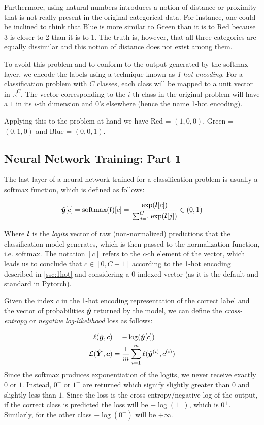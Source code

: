 Furthermore, using natural numbers introduces a notion of distance or proximity that is not really present in the original categorical data. For instance, one could be inclined to think that Blue is more similar to Green than it is to Red because 3 is closer to 2 than it is to 1. The truth is, however, that all three categories are equally dissimilar and this notion of distance does not exist among them.

To avoid this problem and to conform to the output generated by the softmax layer, we encode the labels using a technique known as \emph{1-hot encoding}. For a classification problem with $C$ classes, each class will be mapped to a unit vector in $\mathbb{R}^C$. The vector corresponding to the $i$-th class in the original problem will have a $1$ in its $i$-th dimension and $0$'s elsewhere (hence the name 1-hot encoding).

Applying this to the problem at hand we have Red = $(1,0,0)$, Green = $(0,1,0)$ and Blue = $(0,0,1)$.

\subsection{Neural Network Training: Part 1}
The last layer of a neural network trained for a classification problem is usually a softmax function, which is defined as follows:

\begin{equation*}
    \hat{\bm{y}}[c] = \text{softmax}(\bm{l})[c] = \frac{\exp(\bm{l}[c])}{\sum_{j=1}^C \exp(\bm{l}[j])} \in (0,1)
\end{equation*}

Where $\bm{l}$ is the \emph{logits} vector of raw (non-normalized) predictions that the classification model generates, which is then passed to the normalization function, i.e. softmax. The notation $[c]$ refers to the $c$-th element of the vector, which leads us to conclude that $c \in [0,C-1]$ according to the 1-hot encoding described in \ref{ssc:1hot} and considering a 0-indexed vector (as it is the default and standard in Pytorch).

Given the index $c$ in the 1-hot encoding representation of the correct label and the vector of probabilities $\hat{\bm{y}}$ returned by the model, we can define the \emph{cross-entropy} or \emph{negative log-likelihood} loss as follows:

\begin{align*}
    \ell(\hat{\bm{y}},c) &= -\log(\hat{\bm{y}}[c]) \\
    \mathcal{L}(\hat{\bm{Y}},\bm{c}) &= \frac{1}{m}\sum_{i=1}^m \ell(\hat{\bm{y}}^{(i)},c^{(i)})
\end{align*}
Since the softmax produces exponentiation of the logits, we never receive exactly $0$ or $1$. Instead, $0^+$ or $1^-$ are returned which signify slightly greater than $0$ and slightly less than $1$.
Since the loss is the cross entropy/negative log of the output, if the correct class is predicted the loss will be $-\log(1^-)$, which is $0^+$. Similarly, for the other class $-\log(0^+)$ will be $+\infty$.

